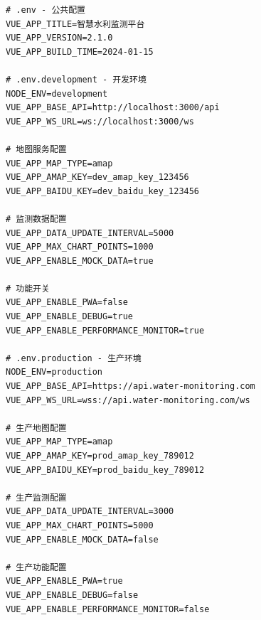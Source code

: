 \begin{lstlisting}[style=terminal]
# .env - 公共配置
VUE_APP_TITLE=智慧水利监测平台
VUE_APP_VERSION=2.1.0
VUE_APP_BUILD_TIME=2024-01-15

# .env.development - 开发环境
NODE_ENV=development
VUE_APP_BASE_API=http://localhost:3000/api
VUE_APP_WS_URL=ws://localhost:3000/ws

# 地图服务配置
VUE_APP_MAP_TYPE=amap
VUE_APP_AMAP_KEY=dev_amap_key_123456
VUE_APP_BAIDU_KEY=dev_baidu_key_123456

# 监测数据配置
VUE_APP_DATA_UPDATE_INTERVAL=5000
VUE_APP_MAX_CHART_POINTS=1000
VUE_APP_ENABLE_MOCK_DATA=true

# 功能开关
VUE_APP_ENABLE_PWA=false
VUE_APP_ENABLE_DEBUG=true
VUE_APP_ENABLE_PERFORMANCE_MONITOR=true

# .env.production - 生产环境
NODE_ENV=production
VUE_APP_BASE_API=https://api.water-monitoring.com
VUE_APP_WS_URL=wss://api.water-monitoring.com/ws

# 生产地图配置
VUE_APP_MAP_TYPE=amap
VUE_APP_AMAP_KEY=prod_amap_key_789012
VUE_APP_BAIDU_KEY=prod_baidu_key_789012

# 生产监测配置
VUE_APP_DATA_UPDATE_INTERVAL=3000
VUE_APP_MAX_CHART_POINTS=5000
VUE_APP_ENABLE_MOCK_DATA=false

# 生产功能配置
VUE_APP_ENABLE_PWA=true
VUE_APP_ENABLE_DEBUG=false
VUE_APP_ENABLE_PERFORMANCE_MONITOR=false
\end{lstlisting}


